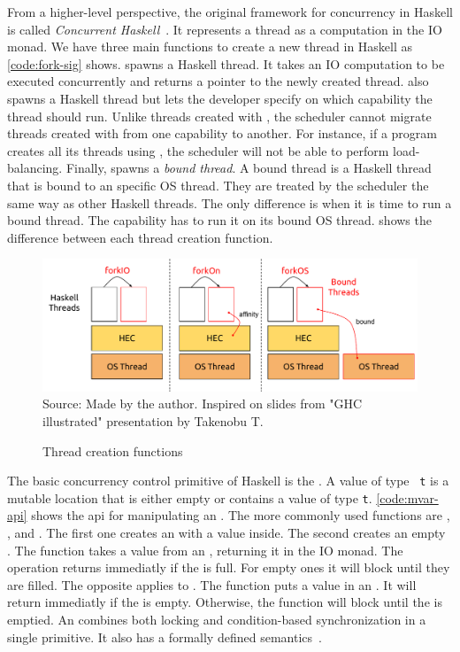 From a higher-level perspective, the original framework for concurrency in Haskell is called \emph{Concurrent Haskell}~\cite{smpj:1996}. It represents a thread as a computation in the IO monad. We have three main functions to create a new thread in Haskell as \autoref{code:fork-sig} shows. \forkIO spawns a Haskell thread. It takes an IO computation to be executed concurrently and returns a pointer to the newly created thread. \forkOn also spawns a Haskell thread but lets the developer specify on which capability the thread should run. Unlike threads created with \forkIO, the scheduler cannot migrate threads created with \forkOn from one capability to another. For instance, if a program creates all its threads using \forkOn, the scheduler will not be able to perform load-balancing. Finally, \forkOS spawns a \emph{bound thread}. A bound thread is a Haskell thread that is bound to an specific OS thread. They are treated by the scheduler the same way as other Haskell threads. The only difference is when it is time to run a bound thread. The capability has to run it on its bound OS thread.  shows the difference between each thread creation function.

\begin{figure}[htp]
  \centering
  \caption{Thread creation functions}
  \includegraphics[width=\columnwidth]{images/haskell-threads}
  \footnotesize{Source: Made by the author. Inspired on slides from "GHC illustrated" presentation by Takenobu T.}
  \label{fig:haskell-threads}
\end{figure}

The basic concurrency control primitive of Haskell is the \MVar. A value of type \MVar~\texttt{t} is a mutable location that is either empty or contains a value of type \texttt{t}. \autoref{code:mvar-api} shows the \ac{api} for manipulating an \MVar. The more commonly used functions are \newMVar, \newEmptyMVar, \takeMVar and \putMVar. The first one creates an \MVar with a value inside. The second creates an empty \MVar. The \takeMVar function takes a value from an \MVar, returning it in the IO monad. The operation returns immediatly if the \MVar is full. For empty ones it will block until they are filled. The opposite applies to \putMVar. The function puts a value in an \MVar. It will return immediatly if the \MVar is empty. Otherwise, the function will block until the \MVar is emptied. An \MVar combines both locking and condition-based synchronization in a single primitive. It also has a formally defined semantics~\cite{smpj:1996}.

